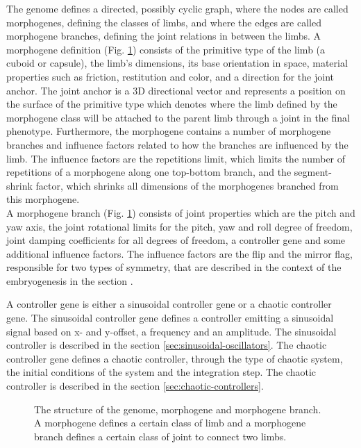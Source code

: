 \documentclass[main]{subfiles}
\begin{document}
The genome defines a directed, possibly cyclic graph, where the nodes are called morphogenes, defining the classes of limbs, and where the edges are called morphogene branches, defining the joint relations in between the limbs. A morphogene definition (Fig. \ref{figure:genome-structure}) consists of the primitive type of the limb (a cuboid or capsule), the limb's dimensions, its base orientation in space, material properties such as friction, restitution and color, and a direction for the joint anchor. The joint anchor is a 3D directional vector and represents a position on the surface of the primitive type which denotes where the limb defined by the morphogene class will be attached to the parent limb through a joint in the final phenotype. Furthermore, the morphogene contains a number of morphogene branches and influence factors related to how the branches are influenced by the limb. The influence factors are the repetitions limit, which limits the number of repetitions of a morphogene along one top-bottom branch, and the segment-shrink factor, which shrinks all dimensions of the morphogenes branched from this morphogene. \\

A morphogene branch (Fig. \ref{figure:genome-structure}) consists of joint properties which are the pitch and yaw axis, the joint rotational limits for the pitch, yaw and roll degree of freedom, joint damping coefficients for all degrees of freedom, a controller gene and some additional influence factors. The influence factors are the flip and the mirror flag, responsible for two types of symmetry, that are described in the context of the embryogenesis in the section \label{subsec:embryogenesis}.

A controller gene is either a sinusoidal controller gene or a chaotic controller gene.  The sinusoidal controller gene defines a controller emitting a sinusoidal signal based on x- and y-offset, a frequency and an amplitude. The sinusoidal controller is described in the section \ref{sec:sinusoidal-oscillators}. The chaotic controller gene defines a chaotic controller, through the type of chaotic system, the initial conditions of the system and the integration step. The chaotic controller is described in the section \ref{sec:chaotic-controllers}.

\begin{figure}[H]
\center


\caption[Indirectly encoded genome structure]{The structure of the genome, morphogene and morphogene branch. A morphogene defines a certain class of limb and a morphogene branch defines a certain class of joint to connect two limbs.}
\label{figure:genome-structure}
\end{figure}
\end{document}
